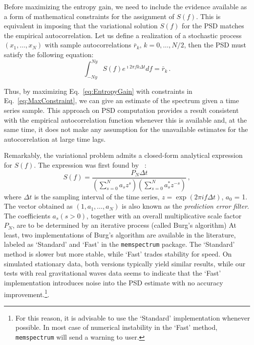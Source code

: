 \documentclass{aa}
\begin{document}
Before maximizing the entropy gain, we need to include the evidence available as a form of mathematical constraints for the assignment of $S(f)$.
This is equivalent in imposing that the variational solution $S(f)$ for the PSD matches the empirical autocorrelation.
Let us define a realization of a stochastic process $(x_1,\ldots,x_N)$ with sample autocorrelations $\bar r_k,\,k=0,\ldots, N/2$, then the PSD must satisfy the following equation:
\begin{equation}\label{eq:MaxConstraint}
\int_{-Ny}^{Ny} S(f) e^{\imath 2 \pi f k \Delta t} df = \bar r_{k}\,.
\end{equation}

Thus, by maximizing Eq.~\eqref{eq:EntropyGain} with constraints in Eq.~\eqref{eq:MaxConstraint}, we can give an estimate of the spectrum given a time series sample.
This approach on PSD computation provides a result consistent with the empirical autocorrelation function whenever this is available and, at the same time, it does not make any assumption for the unavailable estimates for the autocorrelation at large time lags.

Remarkably, the variational problem admits a closed-form analytical expression for $S(f)$.
The expression was first found by ~\citet{burg1975maximum}:
\begin{equation}\label{eq:MESApsd}
    S(f) = \frac{P_N \Delta t}{\left(\sum_{s=0}^{N} a_s z^s\right)\left(\sum_{s = 0}^N a^*_s z^{-s}\right)}\,,
\end{equation}
where $\Delta t$ is the sampling interval of the time series, $z=\exp{(2\pi i f\Delta t)}$, $a_0$ = 1.
The vector obtained as $(1, a_1, \dots, a_N)$ is also known as the \textit{prediction error filter}.
The coefficients $a_s (s > 0)$, together with an overall multiplicative scale factor $P_N$, are to be determined by an iterative process (called Burg's algorithm)
At least, two implementations of Burg's algorithm are available in the literature, labeled as `Standard' and `Fast' in the \texttt{memspectrum} package. The `Standard' method is slower but more stable, while `Fast' trades stability for speed.
On simulated stationary data, both versions typically yield similar results, while our tests with real gravitational waves data seems to indicate that the `Fast' implementation introduces noise into the PSD estimate with no accuracy improvement.\footnote{For this reason, it is advisable to use the `Standard' implementation whenever possible. In most case of numerical instability in the `Fast' method, \texttt{memspectrum} will send a warning to user.}.
\end{document}
